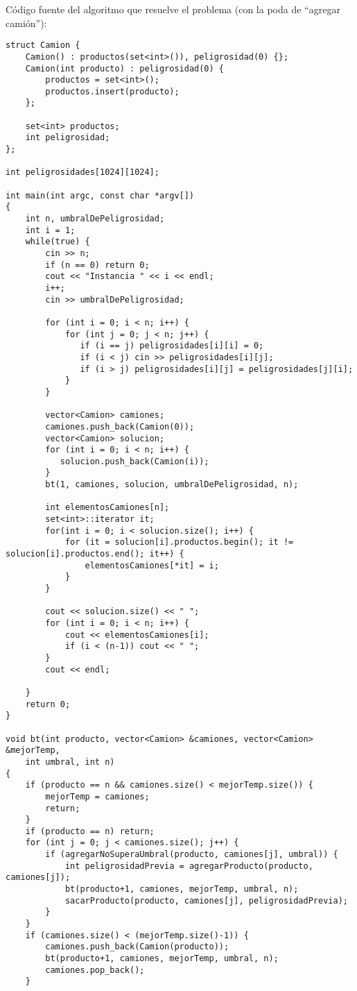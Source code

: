 Código fuente del algoritmo que resuelve el problema (con la poda de ``agregar camión''):
\begin{lstlisting}[frame=single]
struct Camion {
    Camion() : productos(set<int>()), peligrosidad(0) {};
    Camion(int producto) : peligrosidad(0) {
        productos = set<int>();
        productos.insert(producto);
    };

    set<int> productos;
    int peligrosidad;
};

int peligrosidades[1024][1024];

int main(int argc, const char *argv[])
{
    int n, umbralDePeligrosidad;
    int i = 1;
    while(true) {
        cin >> n;
        if (n == 0) return 0;
        cout << "Instancia " << i << endl;
        i++;
        cin >> umbralDePeligrosidad;

        for (int i = 0; i < n; i++) {
            for (int j = 0; j < n; j++) {
               if (i == j) peligrosidades[i][i] = 0;
               if (i < j) cin >> peligrosidades[i][j];  
               if (i > j) peligrosidades[i][j] = peligrosidades[j][i];
            }
        }

        vector<Camion> camiones;
        camiones.push_back(Camion(0));
        vector<Camion> solucion;
        for (int i = 0; i < n; i++) {
           solucion.push_back(Camion(i)); 
        }
        bt(1, camiones, solucion, umbralDePeligrosidad, n);
        
        int elementosCamiones[n];
        set<int>::iterator it;
        for(int i = 0; i < solucion.size(); i++) {
            for (it = solucion[i].productos.begin(); it != solucion[i].productos.end(); it++) {
                elementosCamiones[*it] = i;
            }
        }

        cout << solucion.size() << " ";
        for (int i = 0; i < n; i++) {
            cout << elementosCamiones[i];
            if (i < (n-1)) cout << " ";
        }
        cout << endl;
        
    }
    return 0;
}

void bt(int producto, vector<Camion> &camiones, vector<Camion> &mejorTemp,
    int umbral, int n)
{
    if (producto == n && camiones.size() < mejorTemp.size()) {
        mejorTemp = camiones;
        return;
    }
    if (producto == n) return;
    for (int j = 0; j < camiones.size(); j++) {
        if (agregarNoSuperaUmbral(producto, camiones[j], umbral)) {
            int peligrosidadPrevia = agregarProducto(producto, camiones[j]);
            bt(producto+1, camiones, mejorTemp, umbral, n);
            sacarProducto(producto, camiones[j], peligrosidadPrevia);
        }
    }
    if (camiones.size() < (mejorTemp.size()-1)) {
        camiones.push_back(Camion(producto));
        bt(producto+1, camiones, mejorTemp, umbral, n);
        camiones.pop_back();
    }


\end{lstlisting}
